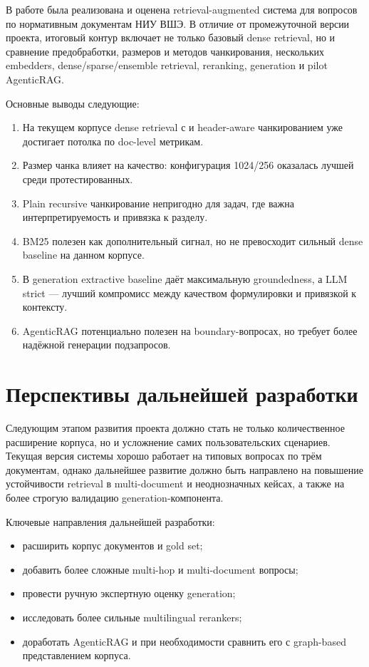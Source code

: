 \documentclass[12pt,a4paper]{article}
\begin{document}
В работе была реализована и оценена retrieval-augmented система для вопросов по нормативным документам НИУ ВШЭ. В отличие от промежуточной версии проекта, итоговый контур включает не только базовый dense retrieval, но и сравнение предобработки, размеров и методов чанкирования, нескольких embedders, dense/sparse/ensemble retrieval, reranking, generation и pilot AgenticRAG.

Основные выводы следующие:
\begin{enumerate}
    \item На текущем корпусе dense retrieval с  и header-aware чанкированием уже достигает потолка по doc-level метрикам.
    \item Размер чанка влияет на качество: конфигурация 1024/256 оказалась лучшей среди протестированных.
    \item Plain recursive чанкирование непригодно для задач, где важна интерпретируемость и привязка к разделу.
    \item BM25 полезен как дополнительный сигнал, но не превосходит сильный dense baseline на данном корпусе.
    \item В generation extractive baseline даёт максимальную groundedness, а LLM strict --- лучший компромисс между качеством формулировки и привязкой к контексту.
    \item AgenticRAG потенциально полезен на boundary-вопросах, но требует более надёжной генерации подзапросов.
\end{enumerate}

\section{Перспективы дальнейшей разработки}

Следующим этапом развития проекта должно стать не только количественное расширение корпуса, но и усложнение самих пользовательских сценариев. Текущая версия системы хорошо работает на типовых вопросах по трём документам, однако дальнейшее развитие должно быть направлено на повышение устойчивости retrieval в multi-document и неоднозначных кейсах, а также на более строгую валидацию generation-компонента.

Ключевые направления дальнейшей разработки:
\begin{itemize}
    \item расширить корпус документов и gold set;
    \item добавить более сложные multi-hop и multi-document вопросы;
    \item провести ручную экспертную оценку generation;
    \item исследовать более сильные multilingual rerankers;
    \item доработать AgenticRAG и при необходимости сравнить его с graph-based представлением корпуса.
\end{itemize}
\end{document}
